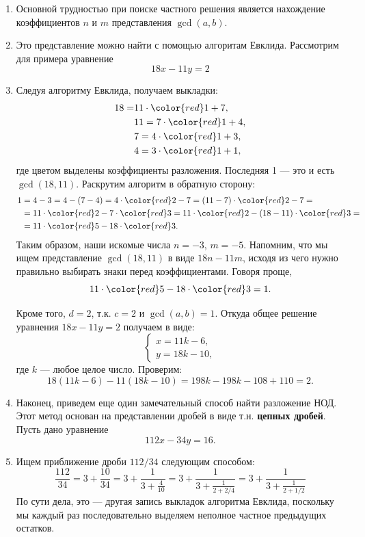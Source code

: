 \begin{enumerate}

\item Основной трудностью при поиске частного решения является нахождение коэффициентов $n$ и $m$ представления $\gcd(a,b)$.
\item Это представление можно найти с помощью алгоритам Евклида. Рассмотрим для примера уравнение
$$
18x-11y=2
$$
\item Следуя алгоритму Евклида, получаем выкладки:
\begin{align*}
18 = & 11\cdot {\color{red}1}+7,\\
   & 11 = 7\cdot {\color{red}1} + 4, \\
   & 7 = 4\cdot {\color{red}1} + 3, \\
   & 4 = 3\cdot {\color{red}1} + 1,
\end{align*}
где цветом выделены коэффициенты разложения. Последняя 1 --- это и есть $\gcd(18,11)$. Раскрутим алгоритм в обратную сторону:
\begin{align*}
1 & = 4-3 = 4 - (7-4) = 4\cdot {\color{red}2}-7 = (11-7)\cdot {\color{red}2}-7 =\\
  & = 11\cdot {\color{red}2}-7\cdot {\color{red}3} = 11\cdot {\color{red}2} - (18-11)\cdot {\color{red}3} =\\
  & = 11\cdot {\color{red}5} - 18\cdot {\color{red}3}.
\end{align*}
Таким образом, наши искомые числа $n=-3$, $m=-5$. Напомним, что мы ищем представление $\gcd(18,11)$ в виде $18n-11m$, исходя из чего нужно правильно выбирать знаки перед коэффициентами. Говоря проще,
$$
11\cdot{\color{red}5}-18\cdot{\color{red}3} = 1.
$$

Кроме того, $d=2$, т.к. $c=2$ и $\gcd(a,b)=1$. Откуда общее решение уравнения $18x-11y=2$ получаем в виде:
$$
\begin{cases}
x  =11k - 6, \\
y  =18k - 10,
\end{cases}
$$
где $k$ --- любое целое число. Проверим:
$$
18(11k - 6) - 11(18k - 10) = 198k-198k - 108 + 110 =2.
$$
\item Наконец, приведем еще один замечательный способ найти разложение НОД. Этот метод основан на представлении дробей в виде т.н. \textbf{цепных дробей}. Пусть дано уравнение
$$
112x-34y=16.
$$
\item Ищем приближение дроби $112/34$ следующим способом:
$$
\frac{112}{34} = 3 + \frac{10}{34} = 3 + \frac{1}{3+\frac{4}{10}} = 
3 + \frac{1}{3 + \frac{1}{2+2/4}} = 3 + \frac{1}{3 + \frac{1}{2+1/2}}
$$
По сути дела, это --- другая запись выкладок алгоритма Евклида, поскольку мы каждый раз последовательно выделяем неполное частное предыдущих остатков.


\end{enumerate}
